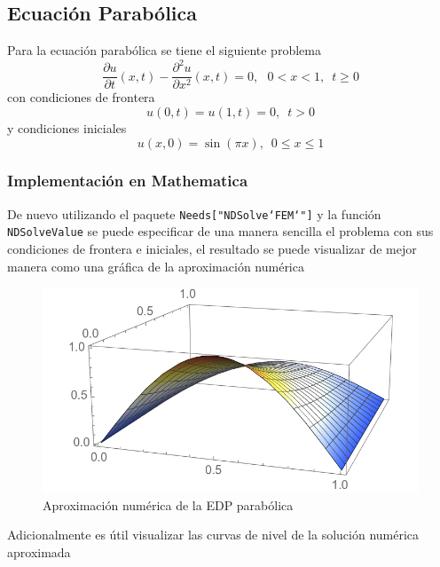 \documentclass[a4paper]{article}
\begin{document}
\subsection{Ecuación Parabólica}
Para la ecuación parabólica se tiene el siguiente problema
\begin{equation}
\frac{\partial u}{\partial t}(x,t)-\frac{\partial^2 u}{\partial x^2}(x,t)=0,\,\,\,\,0<x<1,\,\,\,t\geq 0
\end{equation}
con condiciones de frontera
\begin{equation}
u(0,t)=u(1,t)=0,\,\,\,t>0
\end{equation}
y condiciones iniciales
\begin{equation}
u(x,0)=\sin(\pi x),\,\,\, 0 \leq x \leq 1
\end{equation}
\subsubsection{Implementación en Mathematica}
De nuevo utilizando el paquete \texttt{Needs["NDSolve`FEM`"]} y la función \texttt{NDSolveValue} se puede especificar de una manera sencilla el problema con sus condiciones de frontera e iniciales, el resultado se puede visualizar de mejor manera como una gráfica de la aproximación numérica 
\begin{figure}[H]
\begin{center}
\includegraphics[scale=0.42]{./parabolic.png} 
\end{center} 
\caption{Aproximación numérica de la EDP parabólica}
\label{fig::fig5}
\end{figure}
Adicionalmente es útil visualizar las curvas de nivel de la solución numérica aproximada
\end{document}
